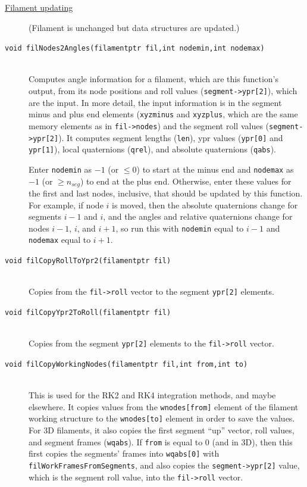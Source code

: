 \documentclass {scrbook}
\newcommand {\ttt} {\texttt}
\begin{document}
\begin{description}
\item[\underline{Filament updating}]
(Filament is unchanged but data structures are updated.)

\item[\ttt{void filNodes2Angles(filamentptr fil,int nodemin,int nodemax)}]
\hfill \\
Computes angle information for a filament, which are this function's output, from its node positions and roll values (\ttt{segment->ypr[2]}), which are the input. In more detail, the input information is in the segment minus and plus end elements (\ttt{xyzminus} and \ttt{xyzplus}, which are the same memory elements as in \ttt{fil->nodes}) and the segment roll values (\ttt{segment->ypr[2]}). It computes segment lengths (\ttt{len}), ypr values (\ttt{ypr[0]} and \ttt{ypr[1]}), local quaternions (\ttt{qrel}), and absolute quaternions (\ttt{qabs}).

Enter \ttt{nodemin} as $-1$ (or $\leq 0$) to start at the minus end and \ttt{nodemax} as $-1$ (or $\geq n_{seg}$) to end at the plus end. Otherwise, enter these values for the first and last nodes, inclusive, that should be updated by this function. For example, if node $i$ is moved, then the absolute quaternions change for segments $i-1$ and $i$, and the angles and relative quaternions change for nodes $i-1$, $i$, and $i+1$, so run this with \ttt{nodemin} equal to $i-1$ and \ttt{nodemax} equal to $i+1$.

\item[\ttt{void filCopyRollToYpr2(filamentptr fil)}]
\hfill \\
Copies from the \ttt{fil->roll} vector to the segment \ttt{ypr[2]} elements.

\item[\ttt{void filCopyYpr2ToRoll(filamentptr fil)}]
\hfill \\
Copies from the segment \ttt{ypr[2]} elements to the \ttt{fil->roll} vector.


\item[\ttt{void filCopyWorkingNodes(filamentptr fil,int from,int to)}]
\hfill \\
This is used for the RK2 and RK4 integration methods, and maybe elsewhere. It copies values from the \ttt{wnodes[from]} element of the filament working structure to the \ttt{wnodes[to]} element in order to save the values. For 3D filaments, it also copies the first segment ``up'' vector, roll values, and segment frames (\ttt{wqabs}). If \ttt{from} is equal to 0 (and in 3D), then this first copies the segments' frames into \ttt{wqabs[0]} with \ttt{filWorkFramesFromSegments}, and also copies the \ttt{segment->ypr[2]} value, which is the segment roll value, into the \ttt{fil->roll} vector.


\end{description}
\end{document}
